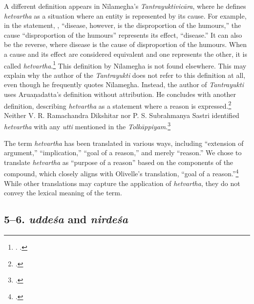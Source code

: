 A different definition appears in Nīlamegha's \emph{Tantrayuktivicāra}, 
where he defines \emph{hetvartha} as a situation 
where an entity is represented by its cause. 
For example, in the statement, , 
“disease, however, is the disproportion of the humours,” 
the cause “disproportion of the humours” represents its effect, “disease.” 
It can also be the reverse, 
where disease is the cause of disproportion of the humours. 
When a cause and its effect are considered equivalent 
and one represents the other, it is called \emph{hetvartha}.\footnote{%
	\begin{verse}
	\end{verse}
	. 
		\cite[4]{muth-1976}.} 
This definition by Nīlamegha is not found elsewhere. 
This may explain why the author of the \emph{Tantrayukti} 
does not refer to this definition at all, 
even though he frequently quotes Nīlamegha. 
Instead, the author of \emph{Tantrayukti} 
uses Aruaṇadatta's definition without attribution. 
He concludes with another definition, describing \emph{hetvartha} as a statement 
where a reason is expressed.\footnote{%
	\begin{verse}
	\end{verse}
	\cite[8]{nara-1949}.} 
Neither V. R. Ramachandra Dikshitar nor P. S. Subrahmanya Sastri 
identified \emph{hetvartha} with any \emph{utti} 
mentioned in the \emph{Tolkāppiyam}.\footcite[84]{chev-2009} 

The term \emph{hetvartha} has been translated in various ways, 
including “extension of argument,” “implication,” 
“goal of a reason,” and merely “reason.” 
We chose to translate \emph{hetvartha} as “purpose of a reason” 
based on the components of the compound, 
which closely aligns with Olivelle’s translation,
“goal of a reason.”\footcite[436]{oliv-2013}
While other translations may capture the application of \emph{hetvartha}, 
they do not convey the lexical meaning of the term.

\subsection{5–6. \emph{uddeśa} and \emph{nirdeśa}}

